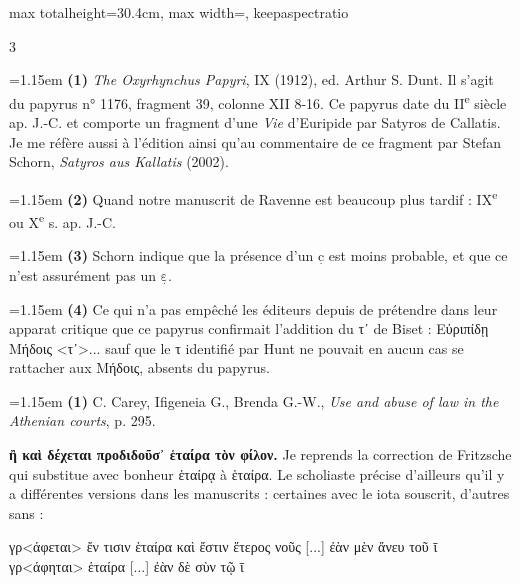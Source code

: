 \documentclass[11pt,twoside]{book}
\newcommand{\italique}[1]{\textit{#1}}
\newcommand{\citComm}[1]{\begin{quoting}[vskip=0.4pt,leftmargin=0.7em,rightmargin=0.2em]#1\end{quoting}}
\newcommand{\nieme}[1]{#1\textsuperscript{e}}
\newcommand{\grec}[1]{{\policeGr #1}}
\newcommand{\douteux}[1]{$\underset{\cdot}{\text{#1}}$}
\begin{document}
\begin{adjustbox}{max totalheight=30.4cm, max width=\textwidth, keepaspectratio}
\begin{minipage}{\textwidth}
{\begin{multicols}{3}
\par\vspace{1.2pt}\par\nopagebreak\vspace{1pt}\noindent\hangindent=1.15em {\color{sepiaNote}\textbf{(1)}} \italique{The Oxyrhynchus Papyri}, IX (1912), ed. Arthur S. Dunt. Il s'agit du papyrus n° 1176, fragment 39, colonne XII 8-16. Ce papyrus date du \nieme{II} siècle ap. J.-C. et comporte un fragment d'une \italique{Vie} d'Euripide par Satyros de Callatis. Je me réfère aussi à l'édition ainsi qu'au commentaire de ce fragment par Stefan Schorn, \italique{Satyros aus Kallatis} (2002).
\par\vspace{1.5pt}
\noindent\hangindent=1.15em {\color{sepiaNote}\textbf{(2)}} Quand notre manuscrit de Ravenne est beaucoup plus tardif : \nieme{IX} ou \nieme{X} s. ap. J.-C.
\par\vspace{1.5pt}
\noindent\hangindent=1.15em {\color{sepiaNote}\textbf{(3)}} Schorn indique que la présence d'un \douteux{c} est moins probable, et que ce n'est assurément pas un \douteux{ε}.
\par\vspace{1.5pt}
\noindent\hangindent=1.15em {\color{sepiaNote}\textbf{(4)}} Ce qui n'a pas empêché les éditeurs depuis de prétendre dans leur apparat critique que ce papyrus confirmait l'addition du τ᾽ de Biset : Εὐριπίδῃ Μήδοις <τ᾽>... sauf que le τ identifié par Hunt ne pouvait en aucun cas se rattacher aux Μήδοις, absents du papyrus.
\par\vspace{1.5pt}
\noindent\hangindent=1.15em {\color{sepiaNote}\textbf{(1)}} C. Carey, Ifigeneia G., Brenda G.-W., \italique{Use and abuse of law in the Athenian courts}, p. 295.
\par\vspace{1.5pt}
 \textbf{ἢ καὶ δέχεται προδιδοῦσ᾽ ἑταίρα τὸν φίλον.} Je reprends la correction de Fritzsche qui substitue avec bonheur \grec{ἑταίρᾳ} à \grec{ἑταίρα}. Le scholiaste précise d'ailleurs qu'il y a différentes versions dans les manuscrits : certaines avec le iota souscrit, d'autres sans :
\citComm{γρ<άφεται> ἔν τισιν ἑταίρα καὶ ἔστιν ἕτερος νοῦς [...] ἐὰν μὲν ἄνευ τοῦ ῑ γρ<άφηται> ἑταίρα [...] ἐὰν δὲ σὺν τῷ ῑ}
\par\vspace{1.5pt}

\end{multicols}}
\end{minipage}
\end{adjustbox}
\end{document}
